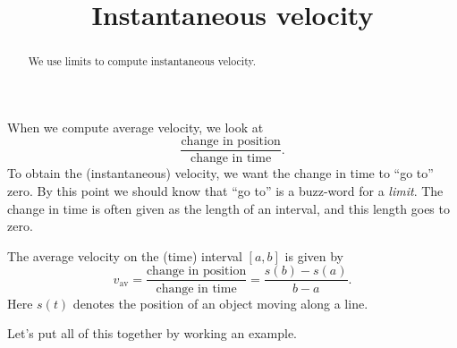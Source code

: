 \documentclass{ximera}
\title[Dig-In:]{Instantaneous velocity}
\begin{document}
\begin{abstract}
We use limits to compute instantaneous velocity.
\end{abstract}
\maketitle

When we compute average velocity, we look at 
\[
\frac{\text{change in position}}{\text{change in time}}.
\]
To obtain the (instantaneous) velocity, we want the change in time to
``go to'' zero. By this point we should know that ``go to'' is a
buzz-word for a \emph{limit}. The change in time is often given as
the length of an interval, and this length goes to zero.

The average velocity on the (time) interval $[a,b]$ is given by
\[
v_{\text{av}} = 
\frac{\text{change in position}}{\text{change in time}} =
\frac{s(b)-s(a)}{b-a}.
\]
Here $s(t)$ denotes the position of an object moving along a line.

Let's put all of this together by working an example.
\end{document}
